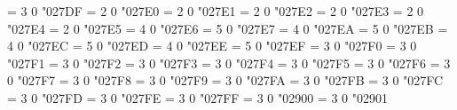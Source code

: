 \Umathchardef\cirbot = 3 0 "027DF %
\Umathchardef\lozengeminus = 2 0 "027E0 %
\Umathchardef\concavediamond = 2 0 "027E1 %
\Umathchardef\concavediamondtickleft = 2 0 "027E2 %
\Umathchardef\concavediamondtickright = 2 0 "027E3 %
\Umathchardef\whitesquaretickleft = 2 0 "027E4 %
\Umathchardef\whitesquaretickright = 2 0 "027E5 %
\Umathchardef\lBrack = 4 0 "027E6 %
\Umathchardef\rBrack = 5 0 "027E7 %
\def\langle{\Udelimiter 4 0 "027E8 }
\def\rangle{\Udelimiter 5 0 "027E9 }
\Umathchardef\lAngle = 4 0 "027EA %
\Umathchardef\rAngle = 5 0 "027EB %
\Umathchardef\Lbrbrak = 4 0 "027EC %
\Umathchardef\Rbrbrak = 5 0 "027ED %
\Umathchardef\lgroup = 4 0 "027EE %
\Umathchardef\rgroup = 5 0 "027EF %
\Umathchardef\UUparrow = 3 0 "027F0 %
\Umathchardef\DDownarrow = 3 0 "027F1 %
\Umathchardef\acwgapcirclearrow = 3 0 "027F2 %
\Umathchardef\cwgapcirclearrow = 3 0 "027F3 %
\Umathchardef\rightarrowonoplus = 3 0 "027F4 %
\Umathchardef\longleftarrow = 3 0 "027F5 %
\Umathchardef\longrightarrow = 3 0 "027F6 %
\Umathchardef\longleftrightarrow = 3 0 "027F7 %
\Umathchardef\Longleftarrow = 3 0 "027F8 %
\Umathchardef\Longrightarrow = 3 0 "027F9 %
\Umathchardef\Longleftrightarrow = 3 0 "027FA %
\Umathchardef\longmapsfrom = 3 0 "027FB %
\Umathchardef\longmapsto = 3 0 "027FC %
\Umathchardef\Longmapsfrom = 3 0 "027FD %
\Umathchardef\Longmapsto = 3 0 "027FE %
\Umathchardef\longrightsquigarrow = 3 0 "027FF %
\Umathchardef\nvtwoheadrightarrow = 3 0 "02900 %
\Umathchardef\nVtwoheadrightarrow = 3 0 "02901 %
